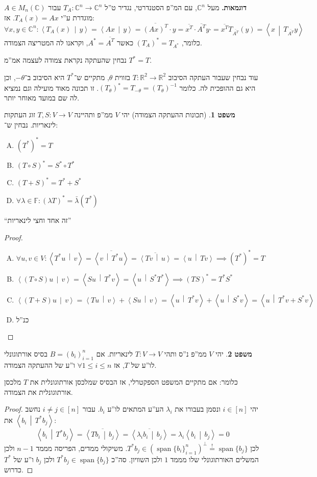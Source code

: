 \documentclass[a4paper]{article}
\newcommand\R     {\mathbb{R}}
\newcommand\C     {\mathbb{C}}
\newcommand\ra    {\rangle}
\newcommand\la    {\langle}
\newcommand\seq   {\overset{!}{=}}
\newcommand\ol    {\overline}
\DeclareMathOperator{\Sp}      {span}
\newcommand\F         {\mathbb{F}}
\newcommand\co        {\colon}
\newcommand\mut [2]   {\left \la #1 \,\middle\vert\, #2 \right \ra}
\newcommand\tg        {\theta}
\renewcommand\lg      {\lambda}
\newcommand\op    {^{-1}}
\theoremstyle{definition}
\newtheorem{Theorem}{משפט}
\newcommand\theo  [1] {\begin{Theorem}#1\end{Theorem}}
\begin{document}
	\textbf{דוגמאות. }
	מעל $\C^n$, עם המ''פ הסטנדרטי, נגדיר ט''ל $T_A \co \C^n \to \C^n$ עבור $A \in M_n(\C)$ מוגדרת ע''י $T_A(x) = Ax$. אז: 
	\[ \forall x, y \in \C^n \co \mut{T_A(x)}{y} = \mut{Ax}{y} = \ol{(Ax)^T} \cdot y = \ol{x^T}\cdot\ol{A^T}y\cdot = \ol{x^T}T_{\ol{A^T}}(y) = \mut{x}{T_{\ol{A^T}}y} \]
	כלומר, $(T_A)^* = T_{A^*}$ כאשר $A^* = \ol{A^T}$, וקראנו לה המטריצה הצמודה. 
	
	נבחין שהעתקה נקראת צמודה לעצמה אמ''מ $T^* = T$. 
	
	עוד נבחין שעבור העתקה הסיבוב $T \co \R^2 \to \R^2$ בזווית $\tg$, מתקיים ש־$T^*$ היא הסיבוב ב־$-\tg$, וכן היא גם ההופכית לה. כלומר $(T_{\tg})^* = T_{-\tg} = (T_\tg)\op$. זו תכונה מאוד מועילה וגם נמציא לה שם במועד מאוחר יותר. 
	
	\theo{(תכונות ההעתקה הצמודה) יהי $V$ ממ''פ ותהיינה $T, S \co V \to V$ זוג העתקות לינאריות. נבחין ש־: 
		\begin{enumerate}[(A)]
			\item \hfil $(T^*)^* = T$
			\item \hfil $(T \circ S)^* = S^* \circ T^*$
			\item \hfil $(T + S)^* = T^* + S^*$
			\item \hfil $\forall \lg \in \F \co (\lg T)^* = \bar \lg (T^*)$
	\end{enumerate}}
	``זה אחד וחצי לינאריות''
	
	\begin{proof}\,
		\begin{enumerate}[A)]
			\item \hfil $\forall u, v \in V \co \mut{T^* u}{v} = \ol{\mut{v}{T^* u}}  = \ol{\mut{Tv}{u}}  = \mut{u}{Tv} \implies (T^*)^* = T$
			\item \hfil $\mut{(T \circ S) u}{v} = \mut{Su}{T^*v} = \mut{u}{S^* T^*} \implies (TS)^* = T^*S^*$
			\item \hfil $\mut{(T + S)u}{v} = \mut{Tu}{v} + \mut{Su}{v} = \mut{u}{T^*v} + \mut{u}{S^*v}  = \mut{u}{T^*v + S^*v}$
			\item כנ''ל
		\end{enumerate}
	\end{proof}
	
	\theo{יהי $V$ ממ''פ נ''ס ותהי $T \co V \to V$ לינאריות. אם $B = (b_i)_{i = 1}^{n}$ בסיס אורתוגונלי לו''ע של $T$, אז $\forall 1 \le i \le n$ ו''ע של ההעתקה הצמודה. }
	כלומר: אם מתקיים המשפט הספקטרלי, אז הבסיס שמלכסן אורתוגונלית את $T$ מלכסן אורתוגונלית את הצמודה. 
	\begin{proof}
		יהי $i \in [n]$ ונסמן בעבורו את $\lg_i$ הע''ע המתאים לו''ע $b_i$. עבור $i \neq j \in [n]$ נחשב את $\mut{b_i}{T^*b_j}$: 
		\[ \mut{b_i}{T^*b_j} = \ol{\mut{Tb_i}{b_j}} = \ol{\mut{\lg _i b_i}{b_j}} = \lg_i \mut{b_i}{b_j} = 0 \]
		לכן $T^*b_j \in (\Sp\{b_i\}_{i = 1}^{n})^{\perp} \seq \Sp\{b_j\}$. משיקולי ממדים, הפריסה מממד $n - 1$ ולכן המשלים האורתוגונלי שלו מממד $1$ ולכן השוויון. סה''כ $T^* b_j \in \Sp\{b_j\}$ ולכן $b_j$ ו''ע של $T^*$ כדרוש. 
	\end{proof}
	
\end{document}
